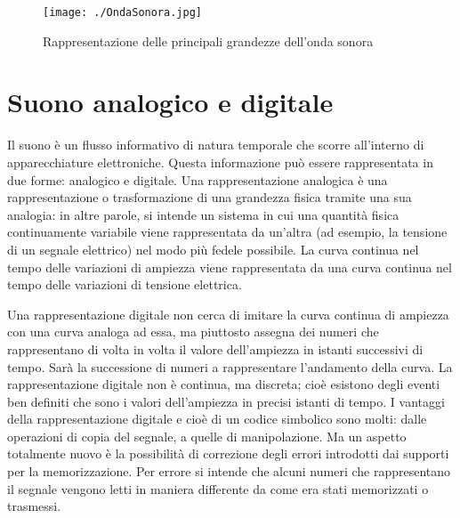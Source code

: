 \begin{figure}[h!]
 \centering
 \texttt{[image: ./OndaSonora.jpg]}
  \label{OndaSonora}
\caption{Rappresentazione delle principali grandezze dell'onda sonora \cite{IONDASON}}
\end{figure}



\section{Suono analogico e digitale}

Il suono \`e un flusso informativo di natura temporale che scorre all'interno di apparecchiature elettroniche. 
Questa informazione pu\`o essere rappresentata in due forme: analogico e digitale. 
Una rappresentazione analogica \`e una rappresentazione o trasformazione di una grandezza fisica tramite una sua analogia: in altre parole, si intende un sistema in cui una quantit\`a fisica continuamente variabile viene rappresentata da un'altra (ad esempio, la tensione di un segnale elettrico) nel modo pi\`u fedele possibile. 
La curva continua nel tempo delle variazioni di ampiezza viene rappresentata da una curva continua nel tempo delle variazioni di tensione elettrica. 


Una rappresentazione digitale non cerca di imitare la curva continua di ampiezza con una curva analoga ad essa, ma piuttosto assegna dei numeri che rappresentano di volta in volta il valore dell'ampiezza in istanti successivi di tempo. 
Sar\`a la successione di numeri a rappresentare l'andamento della curva. 
La rappresentazione digitale non \`e continua, ma discreta; cio\`e esistono degli eventi ben definiti che sono i valori dell'ampiezza in precisi istanti di tempo. 
I vantaggi della rappresentazione digitale e cio\`e di un codice simbolico sono molti: dalle operazioni di copia del segnale, a quelle di manipolazione. 
Ma un aspetto totalmente nuovo \`e la possibilit\`a di correzione degli errori introdotti dai supporti per la memorizzazione. 
Per errore si intende che alcuni numeri che rappresentano il segnale vengono letti in maniera differente da come era stati memorizzati o trasmessi.

